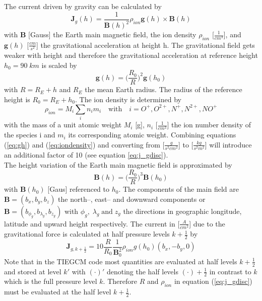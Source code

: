 %
The current driven by gravity can be calculated by
%
\begin{equation}
  \mathbf{J}_g (h) =  \frac{1}{\mathbf{B}(h)^2}\rho_{ion} \mathbf{g}(h) \times \mathbf{B}(h) 
  		\label{eq:j_g}
\end{equation}
%
with $\mathbf{B}$  [Gauss] the Earth main magnetic field, the ion density 
$\rho_{ion}$ [$\frac{1}{cm^3}$], and $\mathbf{g}(h)$  [$\frac{cm}{s^2}$] 
the gravitational acceleration
at height h. The gravitational 
field gets weaker
with height and therefore the  gravitational acceleration at reference height $h_0= 90
\; km$ is scaled by 
%
\begin{equation}
  \mathbf{g}(h)  =  \biggl(\frac{R_0}{R} \biggr)^2\mathbf{g}(h_0) \label{eq:gh}
\end{equation}
%
with $R = R_E + h$ and $R_E$ the mean Earth radius. The radius of
the reference height is $R_0 = R_E + h_0$.
The ion density is determined by 
%
\begin{equation}
  \rho_{ion} = M_i \sum_i n_i m_i  \quad \text{with} \quad i= O^+,O^{2+},N^+,N^{2+},NO^+ 
  		\label{eq:iondensity}
\end{equation}
%
with the mass of a unit atomic weight $M_i$ [g], $n_i$ [$\frac{1}{cm^3}$] the ion number density 
of the species i
and $m_i$ its corresponding atomic weight. Combining equations 
(\ref{eq:gh}) and (\ref{eq:iondensity}) and converting from [$\frac{g}{s^2 cm^2}$] to 
[$\frac{kg}{s^2 m^2}$] will introduce an additional factor of 10 (see equation \ref{eq:j_gdisc}). \\
%
The height variation of the Earth main magnetic
field is approximated by
%
\begin{equation}
  \mathbf{B}(h)  =  \biggl(\frac{R_0}{R} \biggr)^3\mathbf{B}(h_0) \label{eq:bh}
\end{equation}
%
with $\mathbf{B}(h_0)$ [Gaus] referenced to $h_0$.
The components of the main field are $\mathbf{B} = (b_x,b_y,b_z)$  the
north--, east-- and downward components or $\mathbf{B} = (b_{\phi_g},b_{\lambda_g},b_{z_g})$ with
$\phi_g, \; \lambda_g \; \text{and} \; z_g$ the directions in geographic
longitude, latitude and upward height respectively. 
The current in [$\frac{A}{cm^2}$] due to the gravitational force is calculated at half pressure levels
$k+\frac{1}{2}$ by
%
\begin{equation}
  \mathbf{J}_{g,k+\frac{1}{2}} = 10 \frac{R}{R_0} \frac{1}{\mathbf{B}_0^2} \rho_{ion} 
          {g}(h_0) (b_x,-b_y,0) \label{eq:j_gdisc}
\end{equation}
%
Note that in the TIEGCM code most quantities are evaluated at half levels
$k+\frac{1}{2}$ and stored at level $k'$ with $(\cdot)'$ denoting the
half levels $(\cdot) +\frac{1}{2}$ in contrast to $k$ which is the full pressure level 
$k$. Therefore $R$ and $\rho_{ion}$ in equation (\ref{eq:j_gdisc}) must be 
evaluated at the half level $k+\frac{1}{2}$.
%
